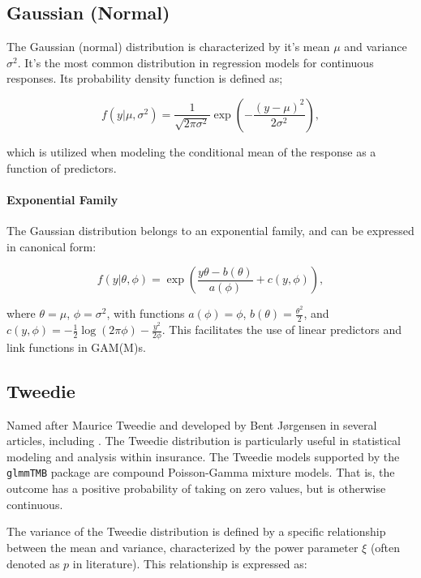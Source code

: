 \documentclass[12pt, twoside,hidelinks]{article}
\theoremstyle{definition}
\numberwithin{equation}{section}
\begin{document}
\subsection{Gaussian (Normal)}

The Gaussian (normal) distribution is characterized by it's mean \(\mu\) and variance \(\sigma^2\). It's the most common distribution in regression models for continuous responses. Its probability density function is defined as;

\begin{equation}
f(y | \mu, \sigma^2) = \frac{1}{\sqrt{2\pi\sigma^2}} \exp\left(-\frac{(y-\mu)^2}{2\sigma^2}\right), 
\end{equation}

which is utilized when modeling the conditional mean of the response as a function of predictors.

\paragraph{Exponential Family}

The Gaussian distribution belongs to an exponential family, and can be expressed in canonical form:

\begin{equation}
    f(y | \theta, \phi) = \exp\left(\frac{y\theta - b(\theta)}{a(\phi)} + c(y, \phi)\right),
\end{equation}

where \(\theta = \mu\), \(\phi = \sigma^2\), with functions \(a(\phi) = \phi\), \(b(\theta) = \frac{\theta^2}{2}\), and \(c(y, \phi) = -\frac{1}{2}\log(2\pi\phi) - \frac{y^2}{2\phi}\). This facilitates the use of linear predictors and link functions in GAM(M)s.

\subsection{Tweedie }\label{app:tweedie}

Named after Maurice Tweedie and developed by Bent Jørgensen in several articles, including \cite{JorgensenDeSouza1994}. The Tweedie distribution is particularly useful in statistical modeling and analysis within insurance.
The Tweedie models supported by the \texttt{glmmTMB} package are compound Poisson-Gamma mixture models. That is, the outcome has a positive probability of taking on zero values, but is otherwise continuous.

The variance of the Tweedie distribution is defined by a specific relationship between the mean and variance, characterized by the power parameter \( \xi \) (often denoted as \( p \) in literature). This relationship is expressed as:
\end{document}
